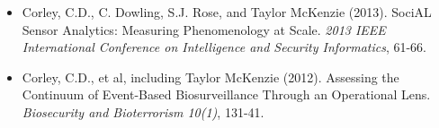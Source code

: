 \documentclass[11pt]{article}
\newenvironment{changemargin}[2]{%
  \begin{list}{}{%
    \setlength{\topsep}{0pt}%
    \setlength{\leftmargin}{#1}%
    \setlength{\rightmargin}{#2}%
    \setlength{\listparindent}{\parindent}%
    \setlength{\itemindent}{\parindent}%
    \setlength{\parsep}{\parskip}%
  }%
  \item[]}{\end{list}
}
\newcommand{\lineover}{
	\begin{changemargin}{-0.05in}{-0.05in}
		\vspace*{-8pt}
		\hrulefill \\
		\vspace*{-2pt}
	\end{changemargin}
}
\newcommand{\header}[1]{
	\begin{changemargin}{-0.5in}{-0.5in}
		\scshape{#1}\\
	\vspace*{-5pt}
  	\lineover
	\end{changemargin}
}
\newenvironment{body} {
	\vspace*{-16pt}
	\begin{changemargin}{-0.25in}{-0.5in}
  }	
	{\end{changemargin}
}
\begin{document}
\begin{body}
\begin{itemize}
	\item Corley, C.D., C. Dowling, S.J. Rose, and Taylor McKenzie (2013). SociAL Sensor Analytics: Measuring Phenomenology at Scale. \textit{2013 IEEE International Conference on Intelligence and Security Informatics}, 61-66.
	\item Corley, C.D., et al, including Taylor McKenzie (2012). Assessing the Continuum of Event-Based Biosurveillance Through an Operational Lens. \textit{Biosecurity and Bioterrorism 10(1)}, 131-41.
\end{itemize}
\end{body}



\end{document}
